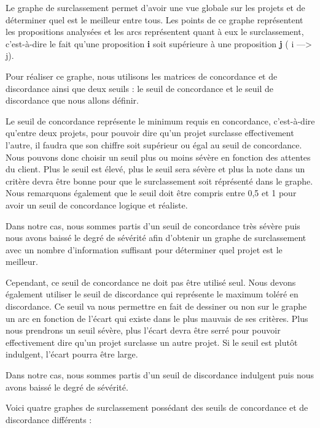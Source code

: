 \documentclass[a4paper,10pt]{article}
\begin{document}
Le graphe de surclassement permet d'avoir une vue globale sur les projets et de déterminer quel est le meilleur entre tous. Les points de ce graphe représentent les propositions analysées et les arcs représentent quant à eux le surclassement, c'est-à-dire le fait qu'une proposition \textbf{i} soit supérieure à une proposition \textbf{j} ( i ---> j).

Pour réaliser ce graphe, nous utilisons les matrices de concordance et de discordance ainsi que deux seuils : le seuil de concordance et le seuil de discordance que nous allons définir.

Le seuil de concordance représente le minimum requis en concordance, c'est-à-dire qu'entre deux projets, pour pouvoir dire qu'un projet surclasse effectivement l'autre, il faudra que son chiffre soit supérieur ou égal au seuil de concordance. Nous pouvons donc choisir un seuil plus ou moins sévère en fonction des attentes du client. Plus le seuil est élevé, plus le seuil sera sévère et plus la note dans un critère devra être bonne pour que le surclassement soit réprésenté dans le graphe. Nous remarquons également que le seuil doit être compris entre 0,5 et 1 pour avoir un seuil de concordance logique et réaliste. 

Dans notre cas, nous sommes partis d'un seuil de concordance très sévère puis nous avons baissé le degré de sévérité afin d'obtenir un graphe de surclassement avec un nombre d'information suffisant pour déterminer quel projet est le meilleur.

Cependant, ce seuil de concordance ne doit pas être utilisé seul. Nous devons également utiliser le seuil de discordance qui représente le maximum toléré en discordance. Ce seuil va nous permettre en fait de dessiner ou non sur le graphe un arc en fonction de l'écart qui existe dans le plus mauvais de ses critères. Plus nous prendrons un seuil sévère, plus l'écart devra être serré pour pouvoir effectivement dire qu'un projet surclasse un autre projet. Si le seuil est plutôt indulgent, l'écart pourra être large.

Dans notre cas, nous sommes partis d'un seuil de discordance indulgent puis nous avons baissé le degré de sévérité. 

Voici quatre graphes de surclassement possédant des seuils de concordance et de discordance différents :
\end{document}
